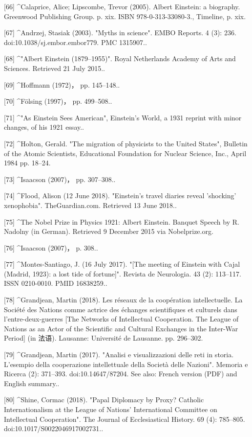 [66]
^Calaprice, Alice; Lipscombe, Trevor (2005). Albert Einstein: a biography. Greenwood Publishing Group. p. xix. ISBN 978-0-313-33080-3., Timeline, p. xix.

[67]
^Andrzej, Stasiak (2003). "Myths in science". EMBO Reports. 4 (3): 236. doi:10.1038/sj.embor.embor779. PMC 1315907..

[68]
^"Albert Einstein (1879–1955)". Royal Netherlands Academy of Arts and Sciences. Retrieved 21 July 2015..

[69]
^Hoffmann (1972)， pp. 145–148..

[70]
^Fölsing (1997)， pp. 499–508..

[71]
^"As Einstein Sees American", Einstein's World, a 1931 reprint with minor changes, of his 1921 essay..

[72]
^Holton, Gerald. "The migration of physicists to the United States", Bulletin of the Atomic Scientists, Educational Foundation for Nuclear Science, Inc., April 1984 pp. 18–24.

[73]
^Isaacson (2007)， pp. 307–308..

[74]
^Flood, Alison (12 June 2018). "Einstein's travel diaries reveal 'shocking' xenophobia". TheGuardian.com. Retrieved 13 June 2018..

[75]
^The Nobel Prize in Physics 1921: Albert Einstein. Banquet Speech by R. Nadolny (in German). Retrieved 9 December 2015 via Nobelprize.org.

[76]
^Isaacson (2007)， p. 308..

[77]
^Montes-Santiago, J. (16 July 2017). "[The meeting of Einstein with Cajal (Madrid, 1923): a lost tide of fortune]". Revista de Neurologia. 43 (2): 113–117. ISSN 0210-0010. PMID 16838259..

[78]
^Grandjean, Martin (2018). Les réseaux de la coopération intellectuelle. La Société des Nations comme actrice des échanges scientifiques et culturels dans l'entre-deux-guerres [The Networks of Intellectual Cooperation. The League of Nations as an Actor of the Scientific and Cultural Exchanges in the Inter-War Period] (in 法语). Lausanne: Université de Lausanne. pp. 296–302.

[79]
^Grandjean, Martin (2017). "Analisi e visualizzazioni delle reti in storia. L'esempio della cooperazione intellettuale della Società delle Nazioni". Memoria e Ricerca (2): 371–393. doi:10.14647/87204. See also: French version (PDF) and English summary..

[80]
^Shine, Cormac (2018). "Papal Diplomacy by Proxy? Catholic Internationalism at the League of Nations' International Committee on Intellectual Cooperation". The Journal of Ecclesiastical History. 69 (4): 785–805. doi:10.1017/S0022046917002731..

